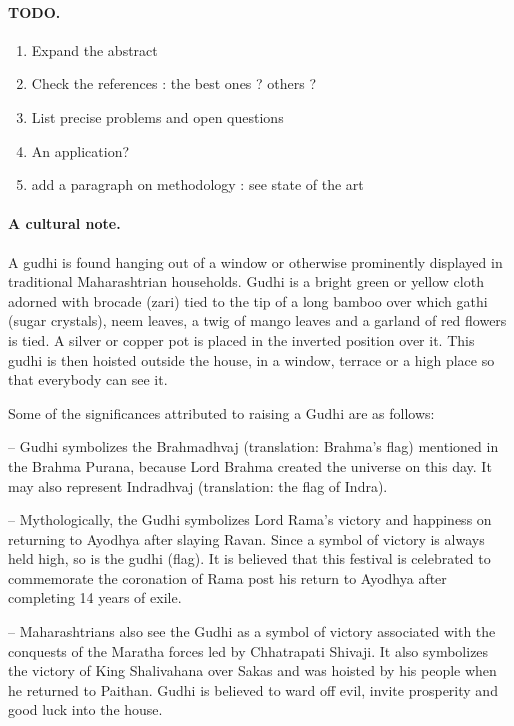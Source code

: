 \documentclass[a4paper, 11pt]{article}
\begin{document}
\paragraph{TODO.} 
\begin{enumerate}
\item Expand the abstract
\item Check the references : the best ones ? others ?
\item List precise problems and open questions
\item An application? 
\item add a paragraph on methodology : see state of the art 
\end{enumerate}

\paragraph{A cultural note.}
A gudhi is found hanging out of a window or otherwise
prominently displayed in traditional Maharashtrian households. Gudhi is
a bright green or yellow cloth adorned with brocade (zari) tied to the
tip of a long bamboo over which gathi (sugar crystals), neem
leaves, a twig of mango leaves and a garland of red
flowers is tied. A silver or copper pot is placed in the inverted
position over it. This gudhi is then hoisted outside the house, in a
window, terrace or a high place so that everybody can see it.

Some of the significances attributed to raising a Gudhi are as follows:

 --   Gudhi symbolizes the Brahmadhvaj (translation: Brahma’s flag)
    mentioned in the Brahma Purana, because Lord Brahma created the
    universe on this day. It may also represent Indradhvaj
    (translation: the flag of Indra).

--   Mythologically, the Gudhi symbolizes Lord Rama’s victory and
   happiness on returning to Ayodhya after slaying Ravan. Since a symbol
   of victory is always held high, so is the gudhi (flag). It is believed
   that this festival is celebrated to commemorate the coronation of Rama
   post his return to Ayodhya after completing 14 years of exile.

--    Maharashtrians also see the Gudhi as a symbol of victory
    associated with the conquests of the Maratha forces led by
    Chhatrapati Shivaji. It also symbolizes the victory of King
    Shalivahana over Sakas and was hoisted by his people when he
    returned to Paithan. Gudhi is believed to ward off evil, invite
    prosperity and good luck into the house.



%
\newpage




%
\end{document}

